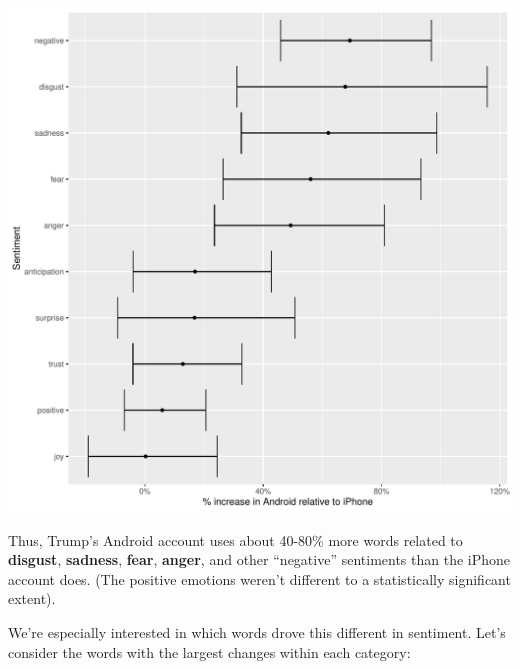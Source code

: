 \documentclass[
]{jss}
\begin{document}
\begin{CodeChunk}


\begin{center}\includegraphics{Live_Demo2_files/figure-latex/unnamed-chunk-7-1} \end{center}

\end{CodeChunk}

Thus, Trump's Android account uses about 40-80\% more words related to
\textbf{disgust}, \textbf{sadness}, \textbf{fear}, \textbf{anger}, and
other ``negative'' sentiments than the iPhone account does. (The
positive emotions weren't different to a statistically significant
extent).

We're especially interested in which words drove this different in
sentiment. Let's consider the words with the largest changes within each
category:
\end{document}

